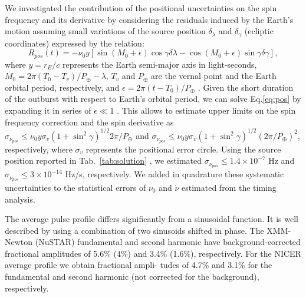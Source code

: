 \documentclass[fleqn,usenatbib]{mnras}
\begin{document}
We investigated the contribution of the positional uncertainties on the spin frequency and its derivative by considering the residuals induced by the Earth's motion assuming small variations of the source position $\delta_{\lambda}$ and $\delta_{\gamma}$ (ecliptic coordinates) expressed by the relation:
\begin{equation}
R_{pos}(t) = - \nu_0 y [\sin(M_0+\epsilon)\cos \gamma \delta\lambda -  \cos(M_0+\epsilon)\sin \gamma \delta\gamma],
\label{eq:pos}
\end{equation}
where $y=r_E/c$ represents the Earth semi-major axis in light-seconds, $M_0=2 \pi (T_0-T_{v})/P_{\oplus}-\lambda$, $T_{v}$ and $P_{\oplus}$ are the vernal point and the Earth orbital period, respectively, and $\epsilon=2\pi(t-T_0)/P_{\oplus}$ \citep[see, e.g.][]{Lyne90}. Given the short duration of the outburst with respect to Earth's orbital period, we can solve Eq.\ref{eq:pos} by expanding it in series of $\epsilon\ll1$ \cite[see e.g.][and references therein]{Burderi:2007tl}. This allows to estimate upper limits on the spin frequency correction and the spin derivative as $\sigma_{\nu_{pos}}\leq \nu_0y\sigma_{v}(1+\sin^2\gamma)^{1/2}2\pi/P_{\oplus}$ and $\sigma_{\dot{\nu}_{pos}}\leq \nu_0y\sigma_{v}(1+\sin^2\gamma)^{1/2}(2\pi/P_{\oplus})^2$, respectively, where $\sigma_{v}$ represents the positional error circle. Using the source position reported in Tab.~\ref{tab:solution} \citep{Jonker:2013wp}, we estimated $\sigma_{\nu_{pos}} \leq 1.4\times 10^{-7}$ Hz and $\sigma_{\dot{\nu}_{pos}} \leq 3\times 10^{-14}$ Hz/s, respectively. We added in quadrature these systematic uncertainties to the statistical errors of $\nu_0$ and $\dot{\nu}$ estimated from the timing analysis.


The average pulse profile differs significantly from a sinusoidal function. It is well described by using a combination of two sinusoids shifted in phase. The XMM-Newton (NuSTAR) fundamental and second harmonic have background-corrected fractional amplitudes of 5.6\% (4\%) and 3.4\% (1.6\%), respectively. For the NICER average profile we obtain fractional ampli- tudes of 4.7\% and 3.1\% for the fundamental and second harmonic (not corrected for the background), respectively.
\end{document}
